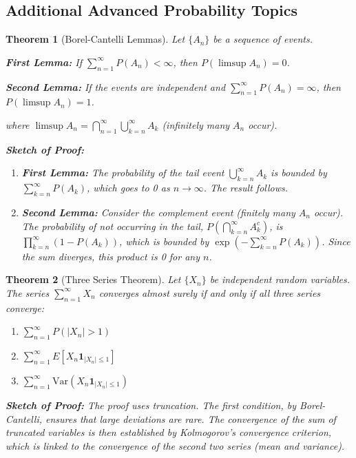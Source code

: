 \documentclass[12pt,a4paper]{article}
\newtheorem{theorem}{Theorem}[section]
\theoremstyle{remark}
\begin{document}
\subsection{Additional Advanced Probability Topics}

\begin{theorem}[Borel-Cantelli Lemmas]
Let $\{A_n\}$ be a sequence of events.

\textbf{First Lemma:} If $\sum_{n=1}^{\infty} P(A_n) < \infty$, then $P(\limsup A_n) = 0$.

\textbf{Second Lemma:} If the events are independent and $\sum_{n=1}^{\infty} P(A_n) = \infty$, then $P(\limsup A_n) = 1$.

where $\limsup A_n = \bigcap_{n=1}^{\infty} \bigcup_{k=n}^{\infty} A_k$ (infinitely many $A_n$ occur).

\textbf{Sketch of Proof:}
\begin{enumerate}
\item \textbf{First Lemma:} The probability of the tail event $\bigcup_{k=n}^\infty A_k$ is bounded by $\sum_{k=n}^\infty P(A_k)$, which goes to 0 as $n \to \infty$. The result follows.
\item \textbf{Second Lemma:} Consider the complement event (finitely many $A_n$ occur). The probability of not occurring in the tail, $P(\bigcap_{k=n}^\infty A_k^c)$, is $\prod_{k=n}^\infty (1-P(A_k))$, which is bounded by $\exp(-\sum_{k=n}^\infty P(A_k))$. Since the sum diverges, this product is 0 for any $n$.
\end{enumerate}
\end{theorem}

\begin{theorem}[Three Series Theorem]
Let $\{X_n\}$ be independent random variables. The series $\sum_{n=1}^{\infty} X_n$ converges almost surely if and only if all three series converge:
\begin{enumerate}
\item $\sum_{n=1}^{\infty} P(|X_n| > 1)$
\item $\sum_{n=1}^{\infty} E[X_n \mathbf{1}_{|X_n| \leq 1}]$
\item $\sum_{n=1}^{\infty} \text{Var}(X_n \mathbf{1}_{|X_n| \leq 1})$
\end{enumerate}

\textbf{Sketch of Proof:} The proof uses truncation. The first condition, by Borel-Cantelli, ensures that large deviations are rare. The convergence of the sum of truncated variables is then established by Kolmogorov's convergence criterion, which is linked to the convergence of the second two series (mean and variance).
\end{theorem}
\end{document}
